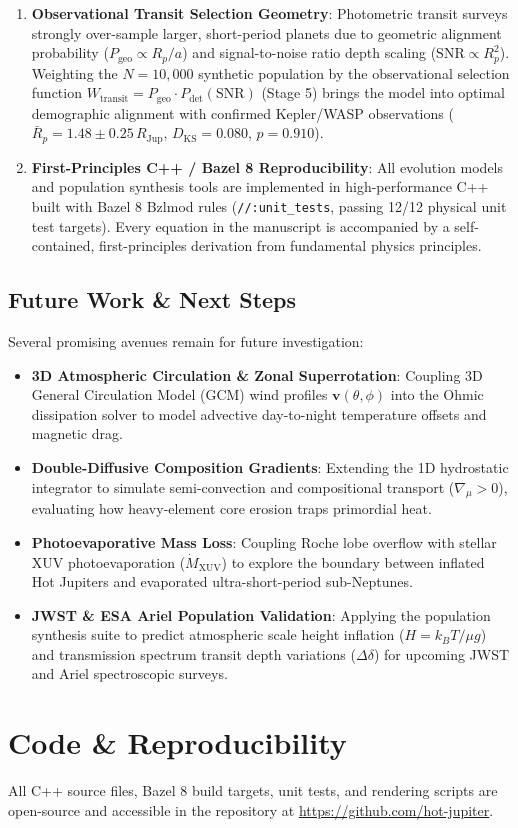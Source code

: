 \begin{enumerate}
    \item \textbf{Observational Transit Selection Geometry}:
    Photometric transit surveys strongly over-sample larger, short-period planets due to geometric alignment probability ($P_{\mathrm{geo}} \propto R_p/a$) and signal-to-noise ratio depth scaling ($\mathrm{SNR} \propto R_p^2$). Weighting the $N = 10,000$ synthetic population by the observational selection function $W_{\mathrm{transit}} = P_{\mathrm{geo}} \cdot P_{\text{det}}(\mathrm{SNR})$ (Stage 5) brings the model into optimal demographic alignment with confirmed Kepler/WASP observations ($\bar{R}_p = 1.48 \pm 0.25\,R_{\mathrm{Jup}}$, $D_{\mathrm{KS}} = 0.080$, $p = 0.910$).

    \item \textbf{First-Principles C++ / Bazel 8 Reproducibility}:
    All evolution models and population synthesis tools are implemented in high-performance C++ built with Bazel 8 Bzlmod rules (\texttt{//:unit\_tests}, passing 12/12 physical unit test targets). Every equation in the manuscript is accompanied by a self-contained, first-principles derivation from fundamental physics principles.
\end{enumerate}

\subsection{Future Work \& Next Steps}
Several promising avenues remain for future investigation:
\begin{itemize}
    \item \textbf{3D Atmospheric Circulation \& Zonal Superrotation}: Coupling 3D General Circulation Model (GCM) wind profiles $\mathbf{v}(\theta, \phi)$ into the Ohmic dissipation solver to model advective day-to-night temperature offsets and magnetic drag.
    \item \textbf{Double-Diffusive Composition Gradients}: Extending the 1D hydrostatic integrator to simulate semi-convection and compositional transport ($\nabla_\mu > 0$), evaluating how heavy-element core erosion traps primordial heat.
    \item \textbf{Photoevaporative Mass Loss}: Coupling Roche lobe overflow with stellar XUV photoevaporation ($\dot{M}_{\mathrm{XUV}}$) to explore the boundary between inflated Hot Jupiters and evaporated ultra-short-period sub-Neptunes.
    \item \textbf{JWST \& ESA Ariel Population Validation}: Applying the population synthesis suite to predict atmospheric scale height inflation ($H = k_B T / \mu g$) and transmission spectrum transit depth variations ($\Delta \delta$) for upcoming JWST and Ariel spectroscopic surveys.
\end{itemize}

\section*{Code \& Reproducibility}
All C++ source files, Bazel 8 build targets, unit tests, and rendering scripts are open-source and accessible in the repository at \url{https://github.com/hot-jupiter}.
